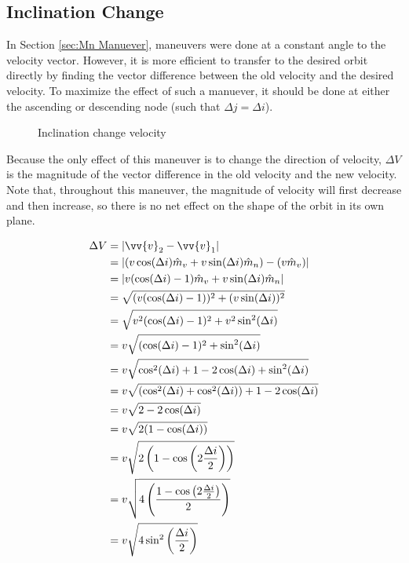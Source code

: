 \documentclass[../basicOrbitalDynamics.tex]{subfiles}
\begin{document}
\bigskip\bigskip
\subsection{Inclination Change}

In Section \ref{sec:Mn Manuever}, maneuvers were done at a constant angle to the velocity vector. However, it is more efficient to transfer to the desired orbit directly by finding the vector difference between the old velocity and the desired velocity. To maximize the effect of such a manuever, it should be done at either the ascending or descending node (such that $\Delta j=\Delta i$).

\begin{figure}[H]
    \centering
    \caption{Inclination change velocity}\label{fig:dV Triangle Inclination Chage}
\end{figure}

Because the only effect of this maneuver is to change the direction of velocity, $\Delta V$ is the magnitude of the vector difference in the old velocity and the new velocity. Note that, throughout this maneuver, the magnitude of velocity will first decrease and then increase, so there is no net effect on the shape of the orbit in its own plane.

\begin{align*}
    \Delta V &= |\vv{v}_2-\vv{v}_1| \\
    &= |(v\cos(\Delta i)\hat{m}_v+v\sin(\Delta i)\hat{m}_n)-(v\hat{m}_v)| \\
    &= |v(\cos(\Delta i)-1)\hat{m}_v+v\sin(\Delta i)\hat{m}_n| \\
    &= \sqrt{(v(\cos(\Delta i)-1))^2+(v\sin(\Delta i))^2} \\
    &= \sqrt{v^2(\cos(\Delta i)-1)^2+v^2\sin^2(\Delta i)} \\
    &= v\sqrt{(\cos(\Delta i)-1)^2+\sin^2(\Delta i)} \\
    &= v\sqrt{\cos^2(\Delta i)+1-2\cos(\Delta i)+\sin^2(\Delta i)} \\
    &= v\sqrt{(\cos^2(\Delta i)+\cos^2(\Delta i))+1-2\cos(\Delta i)} \\
    &= v\sqrt{2-2\cos(\Delta i)} \\
    &= v\sqrt{2(1-\cos(\Delta i))} \\
    &= v\sqrt{2\left(1-\cos\left(2\frac{\Delta i}{2}\right)\right)} \\
    &= v\sqrt{4\left(\frac{1-\cos\left(2\frac{\Delta i}{2}\right)}{2}\right)} \\
    &= v\sqrt{4\sin^2\left(\frac{\Delta i}{2}\right)} \\
\end{align*}
\end{document}
